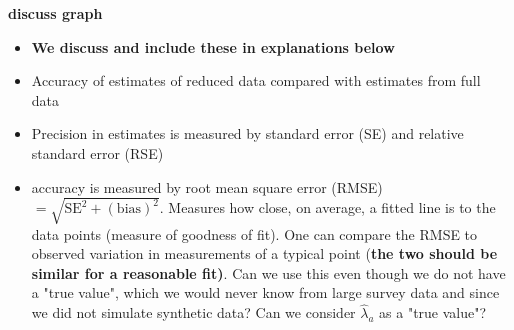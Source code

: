 \documentclass[a4paper 12pt]{article}
\numberwithin{equation}{section}
\begin{document}
{\bf discuss graph}\\

\begin{itemize}
\item {\bf We discuss and include these in explanations below}
\item Accuracy of estimates of reduced data compared with estimates from full data
\item Precision in estimates is measured by standard error (SE) and relative standard error (RSE)
\item accuracy is measured by root mean square error (RMSE) $= \sqrt{\mathrm{SE}^2 + (\mathrm{bias})^2}$. Measures how close, on average, a fitted line is to the data points (measure of goodness of fit). One can compare the RMSE to observed variation in measurements of a typical point {(\bf the two should be similar for a reasonable fit)}. Can we use this even though we do not have a "true value", which we would never know from large survey data and since we did not simulate synthetic data? Can we consider $\hat{\lambda}_{a}$ as a "true value"?
\end{itemize}
\end{document}
